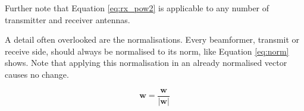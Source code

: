 Further note that Equation \eqref{eq:rx_pow2} is applicable to any number of transmitter and receiver antennas.

A detail often overlooked are the normalisations. Every beamformer, transmit or receive side, should always be normalised to its norm, like Equation \eqref{eq:norm} shows. Note that applying this normalisation in an already normalised vector causes no change.

\begin{equation} \label{eq:norm}
    \bm{w} = \frac{\bm{w}}{\left|\bm{w}\right|}
\end{equation}


\begin{comment}

If MRC is applied when receiving, exactly with the same formula as when transmitting, Equation \eqref{eq:rx_pow} simplifies to Equation \eqref{eq:rx_pow2}. But this is not correct.


\begin{equation} \label{eq:rx_pow2}
    P_r = P_0 \left| \bm{w}_t^\text{T} \bm{H}  \frac{\ \left(\bm{w}_t^\text{T} \bm{H}\right)^H}{\left| \bm{w}_t^\text{T} \bm{H}\right|}\right|^2 = P_0 \left| \bm{w}_t^\text{T} \bm{H}\right|^2
\end{equation}

But this formula does not does not provide the real received power, only something proportional to it, normalised to the number of receive antennas. This common mistake happens due to normalisations. We present the correct formula for the absolute power at the end of this section.

\subsection*{Correction with normalisations}
Notably, observe how normalisations for transmission and reception beamformers should differ. For the transmission, we need to normalise the weight vector to have unitary norm because all the power contributions come from the total transmit power, which we fully decouple from the precoding step. Mathematically, the following (in Equation \eqref{eq:t_norm}) should not alter the value of the precoder. 

\begin{equation} \label{eq:t_norm}
    \bm{w}_t = \frac{\bm{w}_t}{\left|\bm{w}_t\right|}
\end{equation}


\end{comment}
